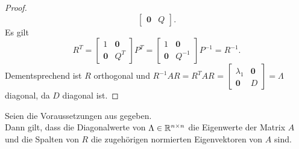 \begin{proof}
\begin{equation*}
\begin{bmatrix}
            \symbf{0} & Q
        \end{bmatrix}. 
    \end{equation*}   
    Es gilt
    \begin{equation*}
        R^{T} =
        \begin{bmatrix}
            1 & \symbf{0} \\
            \symbf{0} & Q^{T}
        \end{bmatrix}
        P^{T}
        =
        \begin{bmatrix}
            1 & \symbf{0} \\
            \symbf{0} & Q^{-1}
        \end{bmatrix}
        P^{-1} 
        =
        R^{-1}.
    \end{equation*}
    Dementsprechend ist \(R\) orthogonal und \(R^{-1}AR = R^{T}AR\) = 
    \(
    \begin{bmatrix}
        {\lambda}_1 & \symbf{0} \\
        \symbf{0} & D
    \end{bmatrix}
    =
    \Lambda
    \)  
    diagonal, da \(D\) diagonal ist.              
\end{proof}
\begin{corollary}\label{cor:spec}
    Seien die Voraussetzungen aus  gegeben.\\
    Dann gilt, dass die Diagonalwerte von \(\Lambda \in \mathbb{R}^{n \times n}\) die Eigenwerte der Matrix \(A\) und die Spalten von \(R\) die zugehörigen normierten Eigenvektoren von \(A\) sind.    
\end{corollary}
